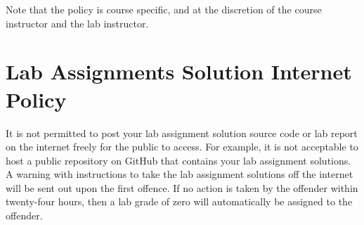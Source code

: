 Note that the policy is course specific, and at the discretion of the course instructor and the lab instructor.

\section*{Lab Assignments Solution Internet Policy} 
It is not permitted to post your lab assignment solution source code or lab report on the internet freely for the public to access. For example, it is not acceptable to host a public repository on GitHub that contains your lab assignment solutions. A warning with instructions to take the lab assignment solutions off the internet will be sent out upon the first offence. If no action is taken by the offender within twenty-four hours, then a lab grade of zero will automatically be assigned to the offender.
    
